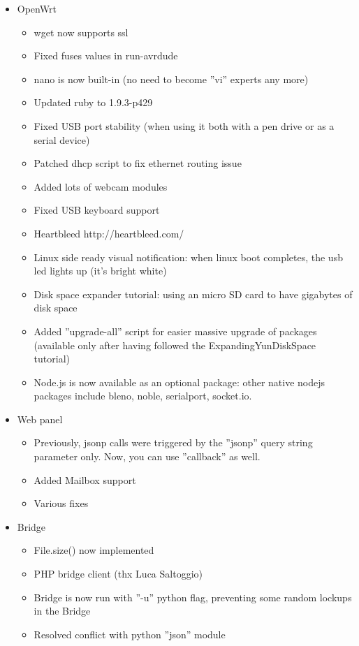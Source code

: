     \begin{itemize}
        \item OpenWrt
            \begin{itemize}
                \item wget now supports ssl
                \item Fixed fuses values in run-avrdude
                \item nano is now built-in (no need to become ''vi'' experts any more)
                \item Updated ruby to 1.9.3-p429
                \item Fixed USB port stability (when using it both with a pen drive or as a serial device)
                \item Patched dhcp script to fix ethernet routing issue
                \item Added lots of webcam modules
                \item Fixed USB keyboard support
                \item Heartbleed http://heartbleed.com/
                \item Linux side ready visual notification: when linux boot completes, the usb led lights up (it's bright white)
                \item Disk space expander tutorial: using an micro SD card to have gigabytes of disk space
                \item Added ''upgrade-all'' script for easier massive upgrade of packages (available only after having followed the ExpandingYunDiskSpace tutorial)
                \item Node.js is now available as an optional package: other native nodejs packages include bleno, noble, serialport, socket.io.
            \end{itemize}

        \item Web panel
            \begin{itemize}
                \item Previously, jsonp calls were triggered by the ''jsonp'' query string parameter only. Now, you can use ''callback'' as well.
                \item Added Mailbox support
                \item Various fixes
            \end{itemize}

        \item Bridge
            \begin{itemize}
                \item File.size() now implemented
                \item PHP bridge client (thx Luca Saltoggio)
                \item Bridge is now run with ''-u'' python flag, preventing some random lockups in the Bridge
                \item Resolved conflict with python ''json'' module
            \end{itemize}
    \end{itemize}

